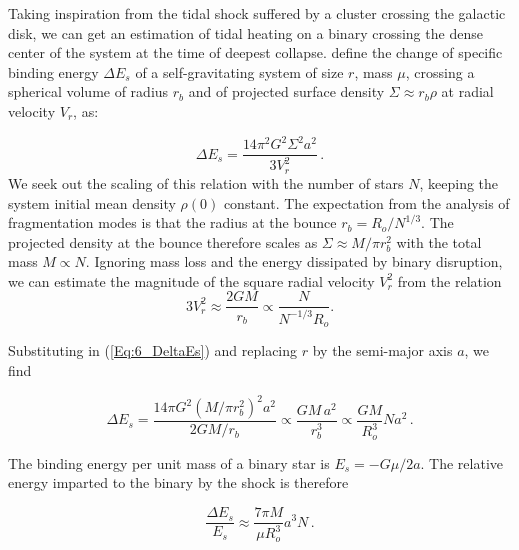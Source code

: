 
Taking inspiration from the tidal shock suffered  by a cluster crossing the galactic disk, we can get an estimation of tidal heating on a binary crossing the dense center of the system at the time of deepest collapse. \cite{BT} define the change of specific binding  energy $\Delta E_s $ of a self-gravitating system of size $r$, mass $\mu$, crossing a spherical volume of radius $r_b$ and of projected surface density $\Sigma \approx r_b \rho$ at radial velocity $V_r$, as:

\begin{equation}
\label{Eq:6_DeltaEs}
\Delta E_s = \frac{14 \pi^2 G^2 \Sigma^2 a^2}{3 V_r^2}\, .
\end{equation}
We seek out the scaling of this relation with the number of stars $N$, keeping the system initial mean density $\rho(0)$ constant.  The expectation from the analysis of fragmentation modes is that the radius at the bounce $r_b = R_o / N^{1/3}$. The projected density at the bounce therefore scales as $\Sigma \approx M / \pi r_b^2 $ with the total mass $M \propto N$. Ignoring mass loss and the energy dissipated by binary disruption, we can estimate the magnitude of the square radial velocity $V_r^2$ from the relation 
\begin{equation}
3 V_r^2 \approx \frac{2G M}{r_b} \propto \frac{N}{N^{-1/3} R_o}.
\end{equation}

Substituting in (\ref{Eq:6_DeltaEs}) and replacing $r$ by the semi-major axis $a$, we find 

\begin{equation}
\Delta E_s =  \frac{14\pi G^2 ( M / \pi r_b^2 )^2 a^2}{ 2GM / r_b } \propto \frac{G M \, a^2}{r_b^3} \propto \frac{GM}{R_o^3} N a^2\, .
\end{equation}

The binding energy per unit mass of a binary star is $E_s = - G \mu / 2 a $. The relative energy imparted to the binary by the shock is therefore 

\begin{equation}
\frac{\Delta E_s }{E_s} \approx \frac{7\pi M}{\mu R_o^3} a^3 N    \, . 
\end{equation}

